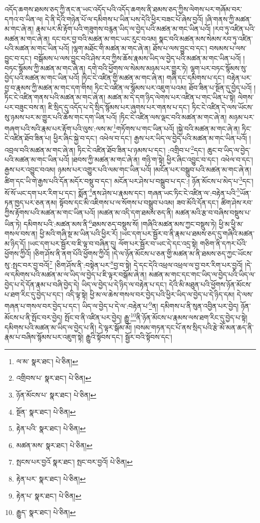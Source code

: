 འདོད་ཆགས་ཐམས་ཅད་ཀྱི་ནང་ན་ཡང་འདོད་པའི་འདོད་ཆགས་ནི་ཐམས་ཅད་ཀྱིས་ལེགས་པར་གཞོམ་བར་དཀའ་བ་ཡིན་ལ། དེ་ནི་དེའི་གཉེན་པོ་ལ་དམིགས་པ་ཡིན་པས་དེའི་ཕྱིར་བཟང་པོ་ཞེས་བྱའོ། །ཞི་གནས་ཀྱི་མཚན་མ་གང་ཞེ་ན། རྣམ་པར་མི་རྟོག་པའི་གཟུགས་བརྙན་ཡིད་ལ་བྱེད་པའི་མཚན་མ་གང་ཡིན་པའོ། །རབ་ཏུ་འཛིན་པའི་མཚན་མ་གང་ཞེ་ན། དང་བར་བྱ་བའི་མཚན་མ་གང་ཡང་རུང་བའམ། སྣང་བའི་མཚན་མས་སེམས་རབ་ཏུ་འཛིན་པའི་མཚན་མ་གང་ཡིན་པའོ། །ལྷག་མཐོང་གི་མཚན་མ་གང་ཞེ་ན། ཐོས་པ་ལས་བྱུང་བ་དང་། བསམས་པ་ལས་བྱུང་བ་དང་། བསྒོམས་པ་ལས་བྱུང་བའི་ཤེས་རབ་ཀྱིས་ཆོས་རྣམས་ཡིད་ལ་བྱེད་པའི་མཚན་མ་གང་ཡིན་པའོ། །བཏང་སྙོམས་ཀྱི་མཚན་མ་གང་ཞེ་ན། དགེ་བའི་ཕྱོགས་ལ་སེམས་མཉམ་པར་གྱུར་ཏེ། ལྷག་པར་བཏང་སྙོམས་སུ་བྱེད་པའི་མཚན་མ་གང་ཡིན་པའོ། །ཏིང་ངེ་འཛིན་གྱི་མཚན་མ་གང་ཞེ་ན། གཞི་དང་དམིགས་པ་དང་། བརྟེན་པར་བྱ་བ་རྣམས་ཀྱི་མཚན་མ་གང་དག་གིས། ཏིང་ངེ་འཛིན་ལ་སྙོམས་པར་འཇུག་པའམ། ཐོབ་ཟིན་པ་སྔོན་དུ་བྱེད་པའོ། །ཏིང་ངེ་འཛིན་གནས་པའི་མཚན་མ་གང་ཞེ་ན། མཚན་མ་དེ་དག་ཉིད་ལེགས་པར་འཛིན་པ་གང་ཡིན་པ་སྟེ། ལེགས་པར་བཟུང་བས་ན། ཇི་སྲིད་དུ་འདོད་པ་དེ་སྲིད་སྙོམས་པར་ཞུགས་པར་གནས་པ་དང་། ཏིང་ངེ་འཛིན་དེ་ལས་ཡོངས་སུ་ཉམས་པར་མ་གྱུར་པའི་ཆོས་གང་དག་ཡིན་པའོ། །ཏིང་ངེ་འཛིན་ལས་ལྡང་བའི་མཚན་མ་གང་ཞེ་ན། མཉམ་པར་གཞག་པའི་སའི་རྣམ་པར་རྟོག་པའི་ལུས་:ལས་མ་\footnote{ལ་མ་  སྣར་ཐང་།  པེ་ཅིན། }གཏོགས་པ་གང་ཡིན་པའོ། །སྐྱེ་བའི་མཚན་མ་གང་ཞེ་ན། ཏིང་ངེ་འཛིན་ཐོབ་ཟིན་པ། ཕྱིར་ཞིང་སྐྱེ་བ་དང་། འཕེལ་བ་དང་། རྒྱས་པར་ཡིད་ལ་བྱེད་པའི་མཚན་མ་གང་ཡིན་པའོ། །འབྲལ་བའི་མཚན་མ་གང་ཞེ་ན། ཏིང་ངེ་འཛིན་ཐོབ་ཟིན་པ་ཉམས་པ་དང་། :འགྲིབ་པ་\footnote{འགྲིབས་པ་  སྣར་ཐང་།  པེ་ཅིན། }དང་། ཆུང་བ་ཡིད་ལ་བྱེད་པའི་མཚན་མ་གང་ཡིན་པའོ། །ཐབས་ཀྱི་མཚན་མ་གང་ཞེ་ན། གཉི་ག་སྟེ། ཕྱིར་ཞིང་འབྱུང་བ་དང་། འཕེལ་བ་དང་། རྒྱས་པར་འབྱུང་བའམ། ཉམས་པར་འགྱུར་པའི་ལམ་གང་ཡིན་པའོ། །མངོན་པར་བསྒྲུབ་པའི་མཚན་མ་གང་ཞེ་ན། ཚིག་དང་ཡི་གེ་རྒྱས་པའི་དོན་མདོར་བསྡུ་བ་དང་། མངོན་པར་ཤེས་པ་བསྒྲུབ་པ་དང་:། ཉོན་མོངས་པ་མེད་པ་\footnote{ཉོན་མོངས་པ་  སྣར་ཐང་།  པེ་ཅིན། }དང་། སོ་སོ་ཡང་དག་པར་རིག་པ་དང་། སྨོན་\footnote{སྔོན་  སྣར་ཐང་།  པེ་ཅིན། }ནས་ཤེས་པ་རྣམས་དང་། གཞན་ཡང་ཏིང་ངེ་འཛིན་ལ་:བརྟེན་པའི་\footnote{རྟེན་པའི་  སྣར་ཐང་།  པེ་ཅིན། }ཡོན་ཏན་ཁྱད་པར་ཅན་ནམ། སྟོབས་དང་མི་འཇིགས་པ་ལ་སོགས་པ་བསྒྲུབ་པའམ། ཟབ་མོའི་དོན་དང་། ཚིག་ཤེས་རབ་ཀྱིས་རྟོགས་པའི་མཚན་མ་གང་ཡིན་པའོ། །མཚན་མ་འདི་དག་ཐམས་ཅད་ནི། མཚན་མའི་རྩ་བ་བཞིས་བསྡུས་པ་ཡིན་ཏེ། དམིགས་པའི་:མཚན་མས་ནི་\footnote{མཚན་མས་  སྣར་ཐང་།  པེ་ཅིན། }ཐམས་ཅད་བསྡུས་སོ། །གཞིའི་མཚན་མས་ཀྱང་བསྡུས་ཏེ། ཕྱི་མ་ཕྱི་མ་གསལ་བས་ན། ཕྱི་མའི་གཞི་སྔ་མ་ཡིན་པའི་ཕྱིར་རོ། །ཡང་དག་པར་སྦྱོར་བ་ནི་རྣམ་པ་ཐམས་ཅད་དུ་གཞིའི་མཚན་མ་ཉིད་དོ། །ཡང་དག་པར་སྦྱོར་བ་ཇི་ལྟ་བ་བཞིན་དུ། ལོག་པར་སྦྱོར་བ་ཡང་དེ་དང་འདྲ་སྟེ། གཅིག་ནི་དཀར་པོའི་ཕྱོགས་ཀྱིའོ། །ཅིག་ཤོས་ནི་ནག་པོའི་ཕྱོགས་ཀྱིའོ། །དེ་ལ་ཉོན་མོངས་པ་ཅན་གྱི་མཚན་མ་ནི་ཐམས་ཅད་ཀྱང་ཡོངས་སུ་:སྤང་བར་བྱ་བའོ།\footnote{སྤངས་པར་བྱའོ  སྣར་ཐང་། སྤང་བར་བྱའོ།  པེ་ཅིན། } །ཅིག་ཤོས་ནི་:བསྟེན་པར་\footnote{རྟེན་པར་  སྣར་ཐང་།  པེ་ཅིན། }བྱ་བ་སྟེ། དེ་དང་དེའི་འཕྲལ་འཕྲལ་ལ་བྱ་བར་རིག་པར་བྱའོ། །དེ་ལ་དམིགས་པའི་མཚན་མ་ལ་ཡིད་ལ་བྱེད་པ་ཇི་ལྟར་བསྒོམ་ཞེ་ན། མཚན་མ་གང་དང་གང་ཡིད་ལ་བྱེད་པའི་ཡིད་ལ་བྱེད་པ་དེ་དོན་རྣམ་པ་བཞི་བྱེད་དེ། ཡིད་ལ་བྱེད་པ་དེ་ཉིད་ལ་བརྟེན་པ་དང་། དེའི་མི་མཐུན་པའི་ཕྱོགས་ཉོན་མོངས་པ་ཐག་རིང་དུ་བྱེད་པ་དང་། འདི་ལྟ་སྟེ། ཕྱི་མ་ལ་ཆེས་གསལ་བར་བྱེད་པའི་ཕྱིར་ཡིད་ལ་བྱེད་པ་དེ་ཉིད་དམ། དེ་ལས་གཞན་པ་གསལ་བར་བྱེད་པ་དང་། ཡིད་ལ་བྱེད་པ་དེ་ལ་:བརྟེན་པ་\footnote{རྟེན་པ་  སྣར་ཐང་།  པེ་ཅིན། }ན། དམིགས་པ་ནི་སུན་འབྱིན་པར་བྱེད། ཉོན་མོངས་པ་ནི་སྤོང་བར་བྱེད། སྤོང་བ་ནི་འཛིན་པར་བྱེད། རྒྱུ་\footnote{རྒྱུད་  སྣར་ཐང་།  པེ་ཅིན། }ནི་ཉོན་མོངས་པ་རྣམས་ལས་ཐག་རིང་དུ་བྱེད་པ་སྟེ། དམིགས་པའི་མཚན་མ་ཡིད་ལ་བྱེད་པ་ནི། དེ་ལྟར་སྒོམ་མོ། །བསམ་གཏན་དང་པོ་ནས་སྲིད་པའི་རྩེ་མོ་མན་ཆད་ནི་རྣམ་པ་བཞིས་སྙོམས་པར་འཇུག་སྟེ། རྒྱུའི་སྟོབས་དང་། སྦྱོར་བའི་སྟོབས་དང་། 